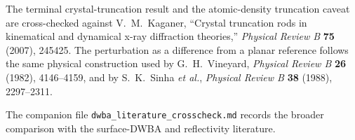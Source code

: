 The terminal crystal-truncation result and the atomic-density truncation caveat
are cross-checked against V.~M.~Kaganer, ``Crystal truncation rods in
kinematical and dynamical x-ray diffraction theories,'' \emph{Physical Review
B} \textbf{75} (2007), 245425.  The perturbation as a difference from a planar
reference follows the same physical construction used by G.~H.~Vineyard,
\emph{Physical Review B} \textbf{26} (1982), 4146--4159, and by S.~K.~Sinha
\emph{et al.}, \emph{Physical Review B} \textbf{38} (1988), 2297--2311.

The companion file \texttt{dwba\_literature\_crosscheck.md} records the broader
comparison with the surface-DWBA and reflectivity literature.

